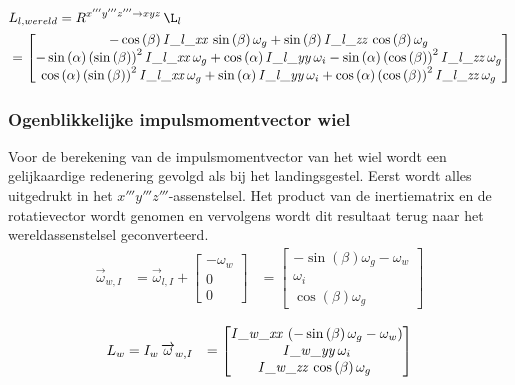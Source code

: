 \begin{align*}
&L_{l,wereld}=R^{x'''y'''z''' \rightarrow xyz}\,\L_{l}\\
&=
\begin{bmatrix}
-\cos \left( \beta \right){\it I\_l\_xx}\,\sin \left( \beta \right) \omega_{g}+\sin \left( \beta \right) {\it 
I\_l\_zz}\,\cos \left( \beta \right) \omega_{g}
\\ 
-\sin \left( \alpha \right)  \left( \sin \left( \beta \right)  \right) 
^{2}{\it I\_l\_xx}\,\omega_{g}+\cos \left( \alpha \right) {\it 
I\_l\_yy}\,\omega_{i}-\sin \left( \alpha \right)  \left( \cos \left( 
\beta \right)  \right) ^{2}{\it I\_l\_zz}\,\omega_{g}
\\ 
\cos \left( \alpha \right)  \left( \sin \left( \beta \right)  \right) ^{2}{\it I\_l\_xx}\,\omega_{g}+\sin \left( \alpha \right) {\it I\_l\_yy}\,\omega_{i}+\cos \left( \alpha \right) \left( \cos \left( \beta \right)  \right) ^{2}{\it I\_l\_zz}\,\omega_
{g}
\end{bmatrix}
\end{align*}

\subsubsection{Ogenblikkelijke impulsmomentvector wiel}
Voor de berekening van de impulsmomentvector van het wiel wordt een gelijkaardige redenering gevolgd als bij het landingsgestel. Eerst wordt alles uitgedrukt in het $x'''y'''z'''$-assenstelsel. Het product van de inertiematrix en de rotatievector wordt genomen en vervolgens wordt dit resultaat terug naar het wereldassenstelsel geconverteerd.
\begin{equation*}
\begin{split}
\overrightarrow{\omega}_{w,I}
&=\overrightarrow{\omega}_{l,I}+
\begin{bmatrix}
-\omega_{w}\\
0\\
0\
\end{bmatrix}
&=\begin{bmatrix}
-\sin \left( \beta \right) \omega_{g}-\omega
_{w}\\
\omega_{i}\\
\cos \left( 
\beta \right) \omega_{g}\
\end{bmatrix}
\end{split}
\end{equation*}

\begin{equation*}
\begin{split}
L_{w}&=I_{w}\,\overrightarrow{\omega}_{w,I}&=
\begin{bmatrix}
{\it I\_w\_xx}\, \left( -\sin \left( \beta
 \right) \omega_{g}-\omega_{w} \right) \\
{\it 
I\_w\_yy}\,\omega_{i}\\
{\it I\_w\_zz}\,\cos \left( 
\beta \right) \omega_{g}\
\end{bmatrix}
\end{split}
\end{equation*}

